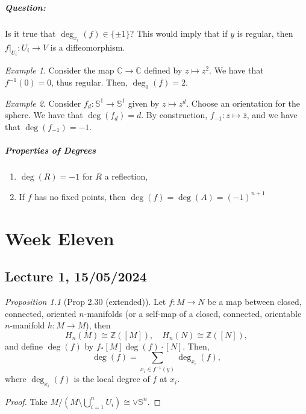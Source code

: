 \documentclass[a4paper]{report}
\theoremstyle{definition}
\theoremstyle{remark}
\theoremstyle{proposition}
\newtheorem{proposition}{Proposition}
\theoremstyle{conjecture}
\theoremstyle{lemma}
\theoremstyle{corollary}
\theoremstyle{exercise}
\newtheorem{example}{Example}
\newcommand{\C}{\mathbb{C}}
\begin{document}
\paragraph{Question:} Is it true that $\deg_{x_i}(f) \in \lbrace \pm 1\rbrace$? This would imply that if $y$ 
is regular, then $f\vert_{U_i} : U_i \to V$ is a diffeomorphism.

\begin{example}
    Consider the map $\C \to \C$ defined by $z\mapsto z^2$. We have that $f^{-1}(0) = 0$, thus regular. 
    Then, $\deg_0(f) = 2$. 
\end{example}

\begin{example}
    Consider $f_d : \mathbb{S}^1 \to \mathbb{S}^1$ given by $z\mapsto z^d$. Choose an orientation for the 
    sphere. We have that $\deg(f_d) = d$. By construction, $f_{-1} : z \mapsto \overline{z}$, 
    and we have that $\deg(f_{-1}) = -1$.
\end{example}

\paragraph{Properties of Degrees}
\begin{enumerate}
    \item $\deg(R) = -1$ for $R$ a reflection, 
    \item If $f$ has no fixed points, then $\deg(f) = \deg(A) = (-1)^{n+1}$
\end{enumerate}

\chapter{Week Eleven}

\section{Lecture 1, 15/05/2024}

\begin{proposition}[Prop 2.30 (extended)]
    Let $f : M \to N$ be a map between closed, connected, oriented $n$-manifolds 
    (or a self-map of a closed, connected, orientable $n$-manifold $h : M \to M$), then 
    $$H_n(M) \cong \mathbb{Z}([M]), \quad H_n(N) \cong \mathbb{Z}([N]),$$ 
    and define $\deg(f)$ by $f_\ast[M] \deg(f) \cdot [N]$.
    Then,
    $$\deg(f) = \sum_{x_i \in f^{-1}(y)} \deg_{x_i}(f),$$
    where $\deg_{x_i}(f)$ is the local degree of $f$ at $x_i$.
\end{proposition}

\begin{proof}
    Take $M/ \left(M\setminus \bigcup_{i=1}^n U_i \right) \cong \vee \mathbb{S}^n$.
\end{proof}
\end{document}
